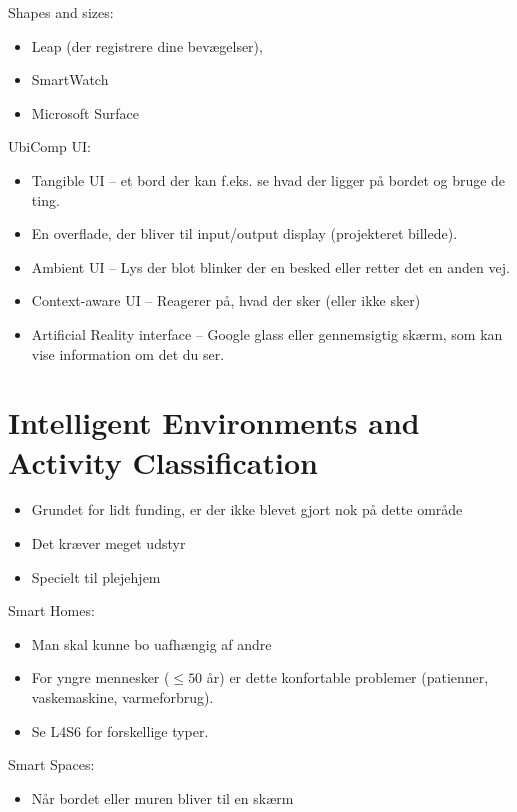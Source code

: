 \documentclass[oneside, 10pt]{article}
\begin{document}
Shapes and sizes:
\begin{itemize}
	\item Leap (der registrere dine bevægelser), 
	\item SmartWatch 
	\item Microsoft Surface
\end{itemize}

UbiComp UI:
\begin{itemize}
	\item Tangible UI -- et bord der kan f.eks. se hvad der ligger på bordet og bruge de ting.
	\item En overflade, der bliver til input/output display (projekteret billede).
	\item Ambient  UI -- Lys der blot blinker der en besked eller retter det en anden vej.
	\item Context-aware UI -- Reagerer på, hvad der sker (eller ikke sker)
	\item Artificial Reality interface -- Google glass eller gennemsigtig skærm, som kan vise information om det du ser.
\end{itemize}




\newpage
\section{Intelligent Environments and Activity Classification}

\begin{itemize}
	\item Grundet for lidt funding, er der ikke blevet gjort nok på dette område
	\item Det kræver meget udstyr
	\item Specielt til plejehjem
\end{itemize}


Smart Homes:
\begin{itemize}
	\item Man skal kunne bo uafhængig af andre
	\item For yngre mennesker ($\leq 50$ år) er dette konfortable problemer (patienner, vaskemaskine, varmeforbrug).
	\item Se L4S6 for forskellige typer.
\end{itemize}


Smart Spaces:
\begin{itemize}
	\item Når bordet eller muren bliver til en skærm
\end{itemize}
\end{document}
